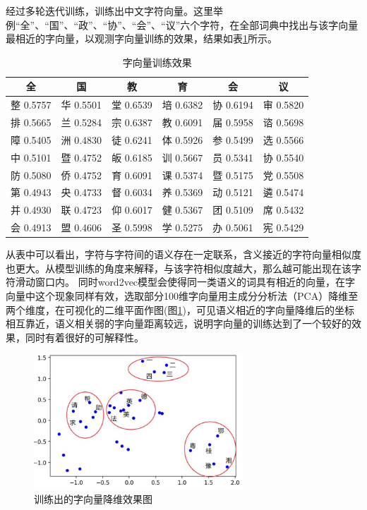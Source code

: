 \documentclass[winfonts,master,oneside,nobackinfo]{njuthesis}
\begin{document}
经过多轮迭代训练，训练出中文字符向量。这里举例“全”、“国”、“政”、“协”、“会”、“议”六个字符，在全部词典中找出与该字向量最相近的字向量，以观测字向量训练的效果，结果如表\ref{char_embedding}所示。

\begin{table}[h]
\centering
\begin{tabular}{cccccc} %
\hline 
全& 国& 教& 育& 会& 议\\
\hline  
整 0.5757& 华 0.5501& 堂 0.6539& 培 0.6382&协 0.6194&审 0.5820\\
排 0.5665& 兰 0.5284& 宗 0.6387& 教 0.6091&届 0.5958&谘 0.5698\\
障 0.5405& 洲 0.4830& 徒 0.6241& 体 0.5926&参 0.5499&选 0.5566\\
中 0.5101& 暨 0.4752& 皈 0.6185& 训 0.5667&员 0.5341&协 0.5540\\
防 0.5080& 侨 0.4752& 育 0.6091& 课 0.5374&暨 0.5175&党 0.5508\\
第 0.4943& 央 0.4733& 督 0.6034& 养 0.5369&动 0.5121&遴 0.5474\\
并 0.4930& 联 0.4723& 仰 0.6017& 健 0.5367&团 0.5109&席 0.5432\\
会 0.4913& 盟 0.4606& 圣 0.5998& 学 0.5275&办 0.5061&宪 0.5429\\
\hline 
\end{tabular}
\caption{字向量训练效果}
\label{char_embedding}
\end{table}

从表中可以看出，字符与字符间的语义存在一定联系，含义接近的字符向量相似度也更大。从模型训练的角度来解释，与该字符相似度越大，那么越可能出现在该字符滑动窗口内。
同时word2vec模型会使得同一类语义的词具有相近的向量，在字向量中这个现象同样有效，选取部分100维字向量用主成分分析法（PCA）降维至两个维度，在可视化的二维平面作图(图\ref{charVecPCA})，可见语义相近的字向量降维后的坐标相互靠近，语义相关弱的字向量距离较远，说明字向量的训练达到了一个较好的效果，同时有着很好的可解释性。

\begin{figure}[h]
\centering
\includegraphics[width=0.7\textwidth]{./figure/字向量降维.jpg}
\caption{训练出的字向量降维效果图}
\label{charVecPCA}
\end{figure}
\end{document}
